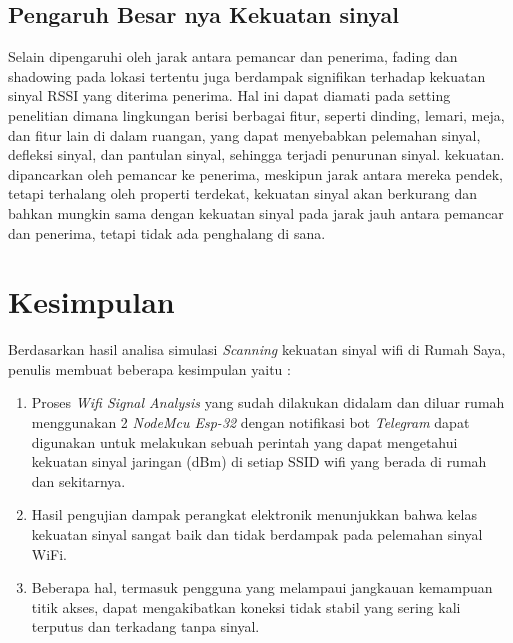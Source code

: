 \documentclass[conference]{IEEEtran}
\begin{document}
        \subsection{Pengaruh Besar nya Kekuatan sinyal}
Selain dipengaruhi oleh jarak antara pemancar dan penerima, fading dan shadowing pada lokasi tertentu juga berdampak signifikan terhadap kekuatan sinyal RSSI yang diterima penerima. Hal ini dapat diamati pada setting penelitian dimana lingkungan berisi berbagai fitur, seperti dinding, lemari, meja, dan fitur lain di dalam ruangan, yang dapat menyebabkan pelemahan sinyal, defleksi sinyal, dan pantulan sinyal, sehingga terjadi penurunan sinyal. kekuatan. dipancarkan oleh pemancar ke penerima, meskipun jarak antara mereka pendek, tetapi terhalang oleh properti terdekat, kekuatan sinyal akan berkurang dan bahkan mungkin sama dengan kekuatan sinyal pada jarak jauh antara pemancar dan penerima, tetapi tidak ada penghalang di sana.

\section{Kesimpulan}

Berdasarkan hasil analisa simulasi \textit{Scanning} kekuatan sinyal wifi di Rumah Saya, penulis membuat beberapa kesimpulan yaitu :
\begin{enumerate}
    \item Proses \textit{Wifi Signal Analysis} yang sudah dilakukan didalam dan diluar rumah  menggunakan 2 \textit{NodeMcu Esp-32} dengan notifikasi bot \textit{Telegram} dapat digunakan untuk melakukan sebuah perintah yang dapat mengetahui kekuatan sinyal jaringan (dBm)
    di setiap SSID wifi yang berada di rumah dan sekitarnya.
    \item Hasil pengujian dampak perangkat elektronik menunjukkan bahwa kelas kekuatan sinyal sangat baik dan tidak berdampak pada pelemahan sinyal WiFi.
   \item Beberapa hal, termasuk pengguna yang melampaui jangkauan kemampuan titik akses, dapat mengakibatkan koneksi tidak stabil yang sering kali terputus dan terkadang tanpa sinyal.
\end{enumerate}
\end{document}
